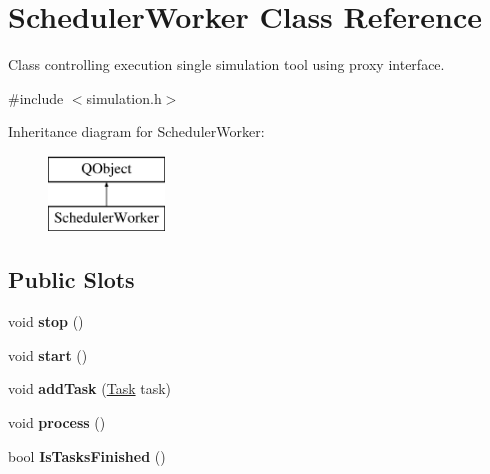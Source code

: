 \hypertarget{class_scheduler_worker}{}\section{Scheduler\+Worker Class Reference}
\label{class_scheduler_worker}


Class controlling execution single simulation tool using proxy interface.  




{\ttfamily \#include $<$simulation.\+h$>$}

Inheritance diagram for Scheduler\+Worker\+:\begin{figure}[H]
\begin{center}
\leavevmode
\includegraphics[height=2.000000cm]{class_scheduler_worker}
\end{center}
\end{figure}
\subsection*{Public Slots}
\begin{DoxyCompactItemize}
\item 
\hypertarget{class_scheduler_worker_ac5b2e3ffa0470416221e3ec07956a628}{}\label{class_scheduler_worker_ac5b2e3ffa0470416221e3ec07956a628} 
void {\bfseries stop} ()
\item 
\hypertarget{class_scheduler_worker_ae17d3b4fd5068714a32b8be97a7ecac1}{}\label{class_scheduler_worker_ae17d3b4fd5068714a32b8be97a7ecac1} 
void {\bfseries start} ()
\item 
\hypertarget{class_scheduler_worker_a15b321a2369b6ccfe7af4351ed4d1960}{}\label{class_scheduler_worker_a15b321a2369b6ccfe7af4351ed4d1960} 
void {\bfseries add\+Task} (\hyperlink{struct_task}{Task} task)
\item 
\hypertarget{class_scheduler_worker_a35a536a33b478e22f28dd508d6eb3242}{}\label{class_scheduler_worker_a35a536a33b478e22f28dd508d6eb3242} 
void {\bfseries process} ()
\item 
\hypertarget{class_scheduler_worker_a93bcfd25dea100ac89372fc14710c86e}{}\label{class_scheduler_worker_a93bcfd25dea100ac89372fc14710c86e} 
bool {\bfseries Is\+Tasks\+Finished} ()
\end{DoxyCompactItemize}

